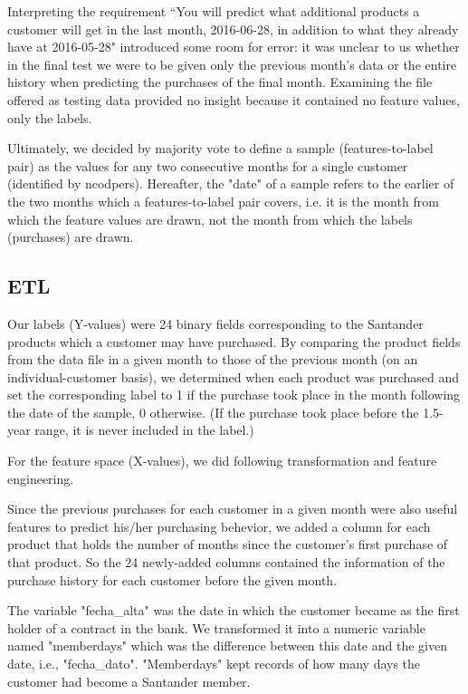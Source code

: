 \documentclass{article}
\begin{document}
\begin{spacing}{1}
\begin{large}
Interpreting the requirement ``You will predict what additional products a customer will get in the last month, 2016-06-28, in addition to what they already have at 2016-05-28" introduced some room for error: it was unclear to us whether in the final test we were to be given only the previous month's data or the entire history when predicting the purchases of the final month. Examining the file offered as testing data provided no insight because it contained no feature values, only the labels.

Ultimately, we decided by majority vote to define a sample (features-to-label pair) as the values for any two consecutive months for a single customer (identified by ncodpers). Hereafter, the "date" of a sample refers to the earlier of the two months which a features-to-label pair covers, i.e. it is the month from which the feature values are drawn, not the month from which the labels (purchases) are drawn.

\subsection{ETL}

Our labels (Y-values) were 24 binary fields corresponding to the Santander products which a customer may have purchased. By comparing the product fields from the data file in a given month to those of the previous month (on an individual-customer basis), we determined when each product was purchased and set the corresponding label to 1 if the purchase took place in the month following the date of the sample, 0 otherwise. (If the purchase took place before the 1.5-year range, it is never included in the label.)

For the feature space (X-values), we did following transformation and feature engineering.

Since the previous purchases for each customer in a given month were also useful features to predict his/her purchasing behevior, we added a column for each product that holds the number of months since the customer’s first purchase of that product. So the 24 newly-added columns contained the information of the purchase history for each customer before the given month.

The variable "fecha\_alta" was the date in which the customer became as the first holder of a contract in the bank. We transformed it into a numeric variable named "memberdays" which was the difference between this date and the given date, i.e., "fecha\_dato". "Memberdays" kept records of how many days the customer had become a Santander member.


\end{large}
\end{spacing}
\end{document}
